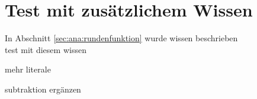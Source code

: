 \section{Test mit zusätzlichem Wissen}

In Abschnitt \ref{sec:ana:rundenfunktion} wurde wissen beschrieben\\
test mit diesem wissen

mehr literale

subtraktion ergänzen

